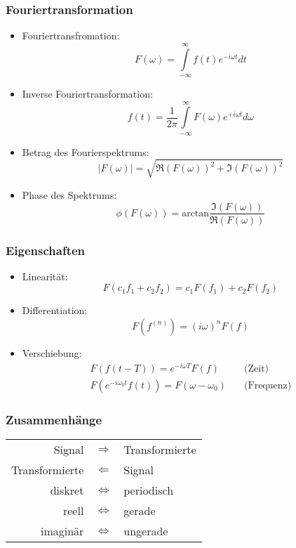 \subsubsection*{Fouriertransformation}
\begin{itemize}
\item Fouriertransfromation: $$F(\omega) = \int\limits_{- \infty}^{\infty} f(t) e^{-i \omega t} dt$$
\item Inverse Fouriertransformation: $$f(t) = \frac{1}{2 \pi} \int\limits_{- \infty}^{\infty} F(\omega) e^{+i \omega t} d \omega$$
\item Betrag des Fourierspektrums: $$|F(\omega)| = \sqrt{\Re(F(\omega))^2 + \Im(F(\omega))^2}$$
\item Phase des Spektrums: $$\phi(F(\omega)) = \textrm{arctan}\frac{\Im(F(\omega))}{\Re(F(\omega))}$$
\end{itemize}

\subsubsection*{Eigenschaften}
\begin{itemize}
\item Linearität: $$F(c_1f_1 + c_2f_2) = c_1F(f_1) + c_2F(f_2)$$
\item Differentiation: $$F(f^{(n)}) = (i \omega)^n F(f)$$
\item Verschiebung: $$\begin{array}{cl} F(f(t-T)) = e^{-i \omega T} F(f) & \quad \textrm{(Zeit)} \\ F(e^{-i \omega_0 t} f(t)) = F(\omega - \omega_0) & \quad \textrm{(Frequenz)} \end{array}$$
\end{itemize}

\subsubsection*{Zusammenhänge}
\begin{center}
\begin{tabular}{rcl}
Signal & $\Rightarrow$ & Transformierte \\ Transformierte & $\Leftarrow$ & Signal \\[0,1cm] diskret & $\Leftrightarrow$ & periodisch \\ reell & $\Leftrightarrow$ & gerade \\ imaginär & $\Leftrightarrow$ & ungerade
\end{tabular}
\end{center}

